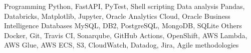 %
%
%

    \begin{keywords}
        \keywordsentry
            {Programming}
            {
                Python,
                FastAPI,
                PyTest,
                Shell scripting
            }
        \keywordsentry
            {Data analysis}
            {
                Pandas,
                Databricks,
                Matplotlib,
                Jupyter,
                Oracle Analytics Cloud,
                Oracle Business Intelligence
            }
        \keywordsentry
            {Databases}
            {
                MySQL,
                DB2,
                PostgreSQL,
                MongoDB,
                SQLite
            }
        \keywordsentry
            {Others}
            {
            	Docker,
                Git,
                Travis CI,
                Sonarqube,
                GitHub Actions,
                OpenShift,
                AWS Lambda,
                AWS Glue,
                AWS ECS,
                S3,
                CloudWatch,
                Datadog,
                Jira,
                Agile methodologies
            }
    \end{keywords}
